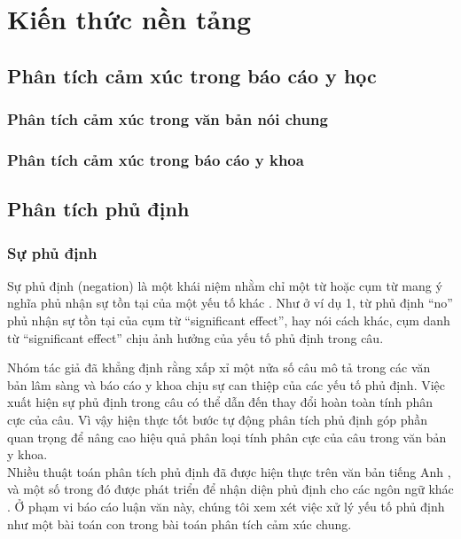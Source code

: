 \section{Kiến thức nền tảng}
\subsection{Phân tích cảm xúc trong báo cáo y học}
\subsubsection*{Phân tích cảm xúc trong văn bản nói chung}
\subsubsection*{Phân tích cảm xúc trong báo cáo y khoa}
\subsection{Phân tích phủ định}
\subsubsection*{Sự phủ định}
Sự phủ định (negation) là một khái niệm nhằm chỉ một từ hoặc cụm từ mang ý nghĩa phủ nhận sự tồn tại của một yếu tố khác \cite{skeppstedt2016marker}. Như ở ví dụ 1, từ phủ định ``no'' phủ nhận sự tồn tại của cụm từ ``significant effect'', hay nói cách khác, cụm danh từ ``significant effect'' chịu ảnh hưởng của yếu tố phủ định trong câu. 


Nhóm tác giả \cite{chapman2001evaluation} đã khẳng định rằng xấp xỉ một nửa số câu mô tả trong các văn bản lâm sàng và báo cáo y khoa chịu sự can thiệp của các yếu tố phủ định. Việc xuất hiện sự phủ định trong câu có thể dẫn đến thay đổi hoàn toàn tính phân cực của câu. Vì vậy hiện thực tốt bước tự động phân tích phủ định góp phần quan trọng để nâng cao hiệu quả phân loại tính phân cực của câu trong văn bản y khoa.\\

Nhiều thuật toán phân tích phủ định đã được hiện thực trên văn bản tiếng Anh \cite{Aronow1999, chapman2001evaluation, Mutalik2001, Elkin2005, Zeng2007}, và một số trong đó được phát triển để nhận diện phủ định cho các ngôn ngữ khác \cite{benamara2012how, costumero2014an, Chapman2013, CruzDiaz2015, gindl2006negation}. Ở phạm vi báo cáo luận văn này, chúng tôi xem xét việc xử lý yếu tố phủ định như một bài toán con trong bài toán phân tích cảm xúc chung.

